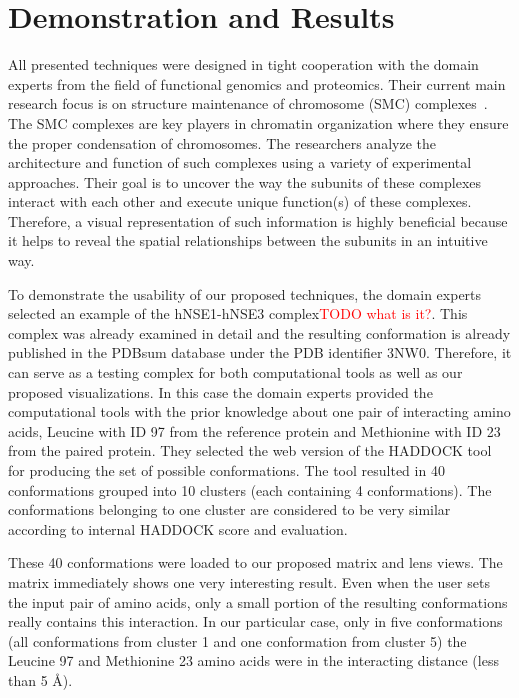 \documentclass[journal]{vgtc}                %
\begin{document}
\section{Demonstration and Results}
All presented techniques were designed in tight cooperation with the domain experts from the field of functional genomics and proteomics.
Their current main research focus is on structure maintenance of chromosome (SMC) complexes~\cite{Hudson2011,Guerineau2012,Palecek2015}. 
The SMC complexes are key players in chromatin organization where they ensure the proper condensation of chromosomes. 
The researchers analyze the architecture and function of such complexes using a variety of experimental approaches. 
Their goal is to uncover the way the subunits of these complexes interact with each other and execute unique function(s) of these complexes. 
Therefore, a visual representation of such information is highly beneficial because it helps to reveal the spatial relationships between the subunits in an intuitive way.

To demonstrate the usability of our proposed techniques, the domain experts selected an example of the hNSE1-hNSE3 complex\textcolor{red}{TODO what is it?}.
This complex was already examined in detail and the resulting conformation is already published in the PDBsum database under the PDB identifier 3NW0.
Therefore, it can serve as a testing complex for both computational tools as well as our proposed visualizations.
In this case the domain experts provided the computational tools with the prior knowledge about one pair of interacting amino acids, Leucine with ID 97 from the reference protein and Methionine with ID 23 from the paired protein.
They selected the web version of the HADDOCK tool for producing the set of possible conformations. 
The tool resulted in 40 conformations grouped into 10 clusters (each containing 4 conformations).
The conformations belonging to one cluster are considered to be very similar according to internal HADDOCK score and evaluation.

These 40 conformations were loaded to our proposed matrix and lens views. 
The matrix immediately shows one very interesting result.
Even when the user sets the input pair of amino acids, only a small portion of the resulting conformations really contains this interaction.
In our particular case, only in five conformations (all conformations from cluster 1 and one conformation from cluster 5) the Leucine 97 and Methionine 23 amino acids were in the interacting distance (less than 5 \AA ).
\end{document}
